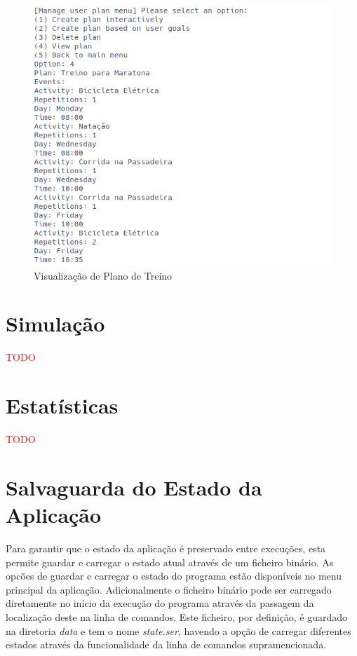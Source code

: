 \documentclass[a4paper,12pt]{scrreprt}
\begin{document}
    \begin{figure}[!ht]
        \centering
        \includegraphics[width=\textwidth]{images/viewPlan.png}
        \caption{Visualização de Plano de Treino}
        \label{fig:view-plan}
    \end{figure}

\clearpage
\section{Simulação}
    \label{sec:simulacao}
    \textcolor{red}{TODO}

\clearpage
\section{Estatísticas}
    \label{sec:estatisticas}
    \textcolor{red}{TODO}

\clearpage
\section{Salvaguarda do Estado da Aplicação}
    \label{sec:salvaguarda-estado}
Para garantir que o estado da aplicação é preservado entre execuções, esta
permite guardar e carregar o estado atual através de um ficheiro binário.
As opcões de guardar e carregar o estado do programa estão disponíveis no menu principal da aplicação. Adicionalmente o ficheiro binário pode ser carregado diretamente no início da execução do programa através da passagem da localização deste na linha de comandos.
Este ficheiro, por definição, é guardado na diretoria \textit{data} e tem o nome \textit{state.ser}, havendo a opção de carregar diferentes estados através da funcionalidade da linha de comandos supramencionada.
\end{document}
